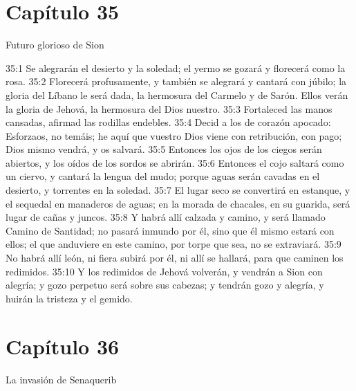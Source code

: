 \section*{Capítulo 35 }
Futuro glorioso de Sion 
 
35:1 Se alegrarán el desierto y la soledad; el yermo se gozará y florecerá como la rosa. 
35:2 Florecerá profusamente, y también se alegrará y cantará con júbilo; la gloria del Líbano le será dada, la hermosura del Carmelo y de Sarón. Ellos verán la gloria de Jehová, la hermosura del Dios nuestro. 
35:3 Fortaleced las manos cansadas, afirmad las rodillas endebles. 
35:4 Decid a los de corazón apocado: Esforzaos, no temáis; he aquí que vuestro Dios viene con retribución, con pago; Dios mismo vendrá, y os salvará. 
35:5 Entonces los ojos de los ciegos serán abiertos, y los oídos de los sordos se abrirán. 
35:6 Entonces el cojo saltará como un ciervo, y cantará la lengua del mudo; porque aguas serán cavadas en el desierto, y torrentes en la soledad. 
35:7 El lugar seco se convertirá en estanque, y el sequedal en manaderos de aguas; en la morada de chacales, en su guarida, será lugar de cañas y juncos. 
35:8 Y habrá allí calzada y camino, y será llamado Camino de Santidad; no pasará inmundo por él, sino que él mismo estará con ellos; el que anduviere en este camino, por torpe que sea, no se extraviará. 
35:9 No habrá allí león, ni fiera subirá por él, ni allí se hallará, para que caminen los redimidos. 
35:10 Y los redimidos de Jehová volverán, y vendrán a Sion con alegría; y gozo perpetuo será sobre sus cabezas; y tendrán gozo y alegría, y huirán la tristeza y el gemido. 
\section*{Capítulo 36 }
La invasión de Senaquerib 
 
